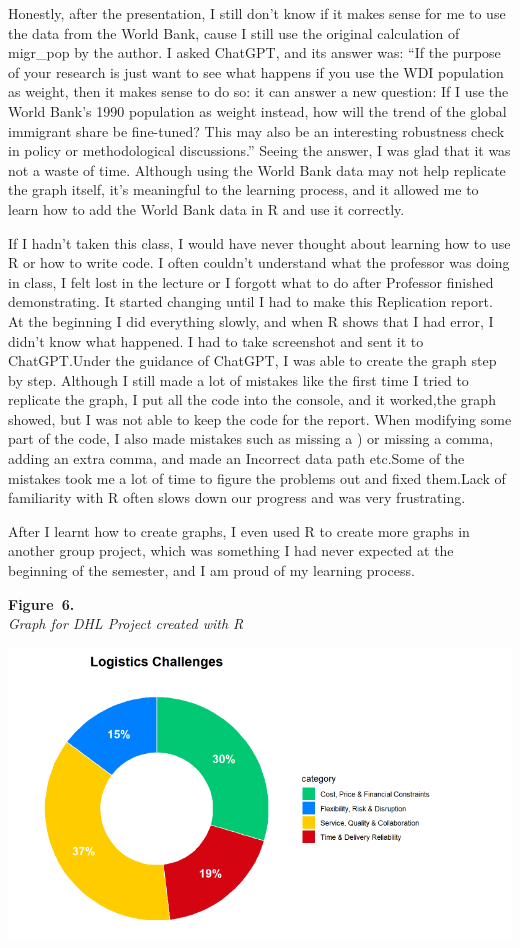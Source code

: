 \documentclass[
  jou,
  floatsintext,
  longtable,
  nolmodern,
  notxfonts,
  notimes,
  colorlinks=true,linkcolor=blue,citecolor=blue,urlcolor=blue]{apa7}
\begin{document}
Honestly, after the presentation, I still don't know if it makes sense
for me to use the data from the World Bank, cause I still use the
original calculation of migr\_pop by the author. I asked ChatGPT, and
its answer was: ``If the purpose of your research is just want to see
what happens if you use the WDI population as weight, then it makes
sense to do so: it can answer a new question: If I use the World Bank's
1990 population as weight instead, how will the trend of the global
immigrant share be fine-tuned? This may also be an interesting
robustness check in policy or methodological discussions.'' Seeing the
answer, I was glad that it was not a waste of time. Although using the
World Bank data may not help replicate the graph itself, it's meaningful
to the learning process, and it allowed me to learn how to add the World
Bank data in R and use it correctly.

If I hadn't taken this class, I would have never thought about learning
how to use R or how to write code. I often couldn't understand what the
professor was doing in class, I felt lost in the lecture or I forgott
what to do after Professor finished demonstrating. It started changing
until I had to make this Replication report. At the beginning I did
everything slowly, and when R shows that I had error, I didn't know what
happened. I had to take screenshot and sent it to ChatGPT.Under the
guidance of ChatGPT, I was able to create the graph step by step.
Although I still made a lot of mistakes like the first time I tried to
replicate the graph, I put all the code into the console, and it
worked,the graph showed, but I was not able to keep the code for the
report. When modifying some part of the code, I also made mistakes such
as missing a ) or missing a comma, adding an extra comma, and made an
Incorrect data path etc.Some of the mistakes took me a lot of time to
figure the problems out and fixed them.Lack of familiarity with R often
slows down our progress and was very frustrating.

After I learnt how to create graphs, I even used R to create more graphs
in another group project, which was something I had never expected at
the beginning of the semester, and I am proud of my learning process.

\label{fig:dhl}
\textbf{Figure~6.}\\
\emph{Graph for DHL Project created with R}

\begin{center}
\includegraphics[width=0.8\linewidth,height=\textheight,keepaspectratio]{fig/dhl.png}
\end{center}
\end{document}

